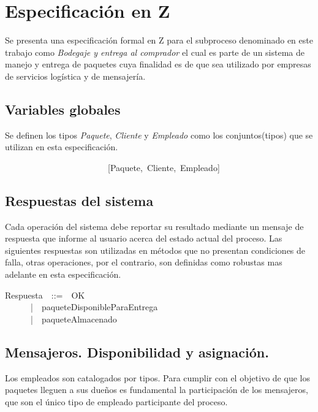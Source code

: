 \documentclass[12pt,a4paper]{article}
\begin{document}
\newpage
\section{Especificación en Z}

Se presenta una especificación formal en Z para el subproceso denominado en este trabajo como \textit{Bodegaje y entrega al comprador} el cual es parte de un sistema de manejo y entrega de paquetes cuya finalidad es de que sea utilizado por empresas de servicios logística y de mensajería.  

\subsection{Variables globales}
Se definen los tipos \textit{Paquete}, \textit{Cliente} y \textit{Empleado}  como los conjuntos(tipos) que se utilizan en esta especificación. 

\begin{zed}
~~~~~~~~~~~~~~~~~~~~~~~~[Paquete,~Cliente,~Empleado]
\end{zed}

\subsection{Respuestas del sistema}

Cada operación del sistema debe reportar su resultado mediante un mensaje de respuesta que informe al usuario acerca del estado actual del proceso. Las siguientes respuestas son utilizadas en métodos que no presentan condiciones de falla, otras operaciones, por el contrario, son definidas como robustas mas adelante en esta especificación.

\begin{zed}
Respuesta~~::=~~OK\\
~~~~~~|~~paqueteDisponibleParaEntrega\\
~~~~~~|~~paqueteAlmacenado\\
\end{zed}

\subsection{Mensajeros. Disponibilidad y asignación.}
\indent Los empleados son catalogados por tipos. Para cumplir con el objetivo de que los paquetes lleguen a sus dueños es fundamental la participación de los mensajeros, que son el único tipo de empleado participante del proceso.
\end{document}
